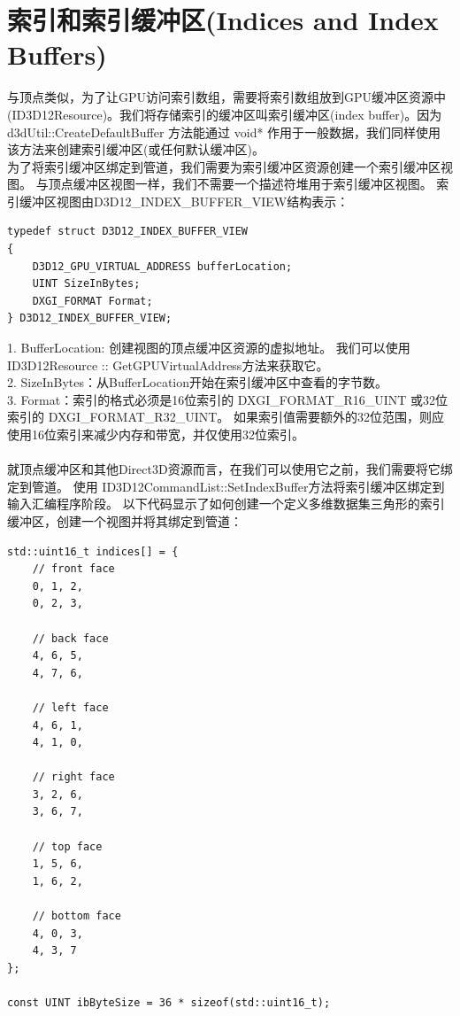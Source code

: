 \documentclass[11pt,a4paper,oldfontcommands]{memoir}
\begin{document}
{\section{索引和索引缓冲区(Indices and Index Buffers)}
\begin{flushleft}
与顶点类似，为了让GPU访问索引数组，需要将索引数组放到GPU缓冲区资源中(ID3D12Resource)。我们将存储索引的缓冲区叫索引缓冲区(index buffer)。因为 d3dUtil::CreateDefaultBuffer 方法能通过 void* 作用于一般数据，我们同样使用该方法来创建索引缓冲区(或任何默认缓冲区)。\\
为了将索引缓冲区绑定到管道，我们需要为索引缓冲区资源创建一个索引缓冲区视图。 与顶点缓冲区视图一样，我们不需要一个描述符堆用于索引缓冲区视图。 索引缓冲区视图由D3D12\_INDEX\_BUFFER\_VIEW结构表示：\\
\begin{lstlisting}
typedef struct D3D12_INDEX_BUFFER_VIEW
{
    D3D12_GPU_VIRTUAL_ADDRESS bufferLocation;
    UINT SizeInBytes;
    DXGI_FORMAT Format;
} D3D12_INDEX_BUFFER_VIEW;
\end{lstlisting}
1. BufferLocation: 创建视图的顶点缓冲区资源的虚拟地址。 我们可以使用ID3D12Resource :: GetGPUVirtualAddress方法来获取它。\\
2. SizeInBytes：从BufferLocation开始在索引缓冲区中查看的字节数。\\
3. Format：索引的格式必须是16位索引的 DXGI\_FORMAT\_R16\_UINT 或32位索引的 DXGI\_FORMAT\_R32\_UINT。 如果索引值需要额外的32位范围，则应使用16位索引来减少内存和带宽，并仅使用32位索引。\\
~\\
就顶点缓冲区和其他Direct3D资源而言，在我们可以使用它之前，我们需要将它绑定到管道。 使用 ID3D12CommandList::SetIndexBuffer方法将索引缓冲区绑定到输入汇编程序阶段。 以下代码显示了如何创建一个定义多维数据集三角形的索引缓冲区，创建一个视图并将其绑定到管道：\\
\begin{lstlisting}
std::uint16_t indices[] = {
    // front face
    0, 1, 2,
    0, 2, 3,
    
    // back face
    4, 6, 5,
    4, 7, 6,
    
    // left face
    4, 6, 1,
    4, 1, 0,
    
    // right face
    3, 2, 6,
    3, 6, 7,
    
    // top face
    1, 5, 6,
    1, 6, 2,
    
    // bottom face
    4, 0, 3,
    4, 3, 7
};

const UINT ibByteSize = 36 * sizeof(std::uint16_t);


\end{lstlisting}
\end{flushleft}}
\end{document}
